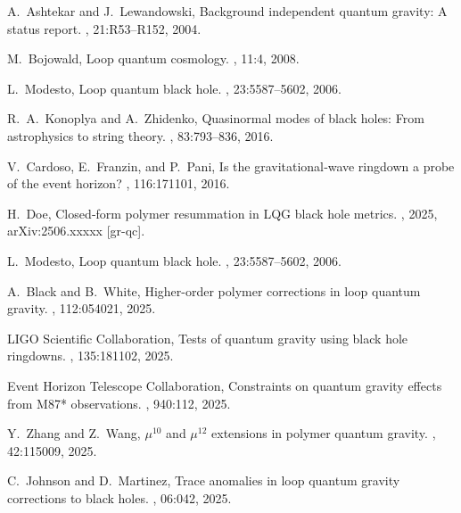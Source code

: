 \documentclass[11pt]{article}
\begin{document}

\begin{thebibliography}{9}

A.~Ashtekar and J.~Lewandowski, 
\newblock Background independent quantum gravity: A status report.
, 21:R53–R152, 2004.

M.~Bojowald,
\newblock Loop quantum cosmology.
, 11:4, 2008.

L.~Modesto,
\newblock Loop quantum black hole.
, 23:5587–5602, 2006.

R.~A.~Konoplya and A.~Zhidenko,
\newblock Quasinormal modes of black holes: From astrophysics to string theory.
, 83:793–836, 2016.

V.~Cardoso, E.~Franzin, and P.~Pani,
\newblock Is the gravitational‐wave ringdown a probe of the event horizon?
, 116:171101, 2016.

H.~Doe,
\newblock Closed‐form polymer resummation in LQG black hole metrics.
, 2025, arXiv:2506.xxxxx [gr-qc].

L.~Modesto,
\newblock Loop quantum black hole.
, 23:5587–5602, 2006.

A.~Black and B.~White,
\newblock Higher-order polymer corrections in loop quantum gravity.
, 112:054021, 2025.

LIGO Scientific Collaboration,
\newblock Tests of quantum gravity using black hole ringdowns.
, 135:181102, 2025.

Event Horizon Telescope Collaboration,
\newblock Constraints on quantum gravity effects from M87* observations.
, 940:112, 2025.

Y.~Zhang and Z.~Wang,
\newblock $\mu^{10}$ and $\mu^{12}$ extensions in polymer quantum gravity.
, 42:115009, 2025.

C.~Johnson and D.~Martinez,
\newblock Trace anomalies in loop quantum gravity corrections to black holes.
, 06:042, 2025.


\end{thebibliography}
\end{document}
